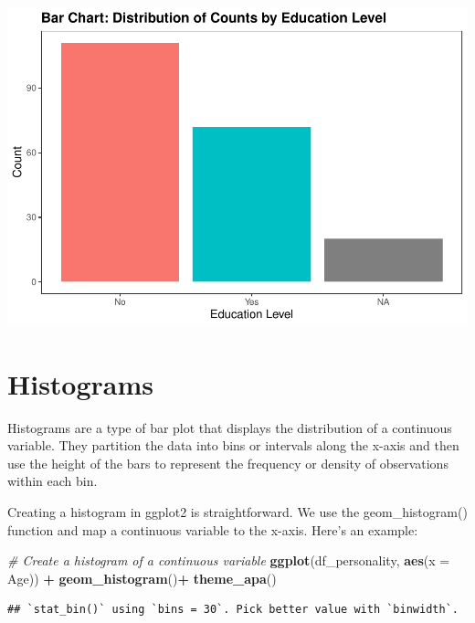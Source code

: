 \documentclass[
]{book}
\newenvironment{Shaded}{\begin{snugshade}}{\end{snugshade}}
\newcommand{\AttributeTok}[1]{\textcolor[rgb]{0.13,0.29,0.53}{#1}}
\newcommand{\CommentTok}[1]{\textcolor[rgb]{0.56,0.35,0.01}{\textit{#1}}}
\newcommand{\FunctionTok}[1]{\textcolor[rgb]{0.13,0.29,0.53}{\textbf{#1}}}
\newcommand{\NormalTok}[1]{#1}
\newcommand{\SpecialCharTok}[1]{\textcolor[rgb]{0.81,0.36,0.00}{\textbf{#1}}}
\begin{document}
\includegraphics{rintro_demo_files/figure-latex/unnamed-chunk-324-1.pdf}

\hypertarget{histograms}{%
\section{Histograms}\label{histograms}}

Histograms are a type of bar plot that displays the distribution of a continuous variable. They partition the data into bins or intervals along the x-axis and then use the height of the bars to represent the frequency or density of observations within each bin.

Creating a histogram in ggplot2 is straightforward. We use the geom\_histogram() function and map a continuous variable to the x-axis. Here's an example:

\begin{Shaded}
\begin{Highlighting}[]
\CommentTok{\# Create a histogram of a continuous variable}
\FunctionTok{ggplot}\NormalTok{(df\_personality, }\FunctionTok{aes}\NormalTok{(}\AttributeTok{x =}\NormalTok{ Age)) }\SpecialCharTok{+}
  \FunctionTok{geom\_histogram}\NormalTok{()}\SpecialCharTok{+}
  \FunctionTok{theme\_apa}\NormalTok{()}
\end{Highlighting}
\end{Shaded}

\begin{verbatim}
## `stat_bin()` using `bins = 30`. Pick better value with `binwidth`.
\end{verbatim}
\end{document}
